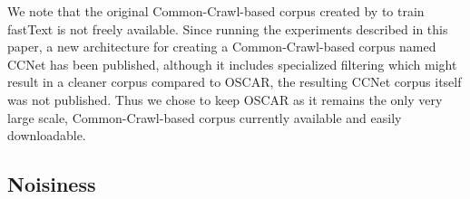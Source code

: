 We note that the original Common-Crawl-based corpus created by \citet{grave-etal-2018-learning} to train fastText is not freely available. Since running the experiments described in this paper, a new architecture for creating a Common-Crawl-based corpus named CCNet \citep{wenzek-etal-2020-ccnet} has been published, although it includes specialized filtering which might result in a cleaner corpus compared to OSCAR, the resulting CCNet corpus itself was not published. Thus we chose to keep OSCAR as it remains the only very large scale, Common-Crawl-based corpus currently available and easily downloadable.

\begin{table}[t]
    \centering\small
    \caption{Size of OSCAR subcorpora, measured in bytes, thousands of tokens, words and sentences.}
    \label{tab:CC}
\end{table}

\subsection{Noisiness}

